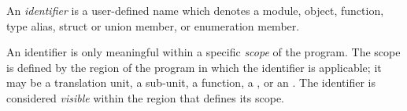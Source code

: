
\begin{grammar}
\\
\\
 \terminal{::} \\

\exactly\\
\\
 \\

\oneof \\
     
     
 \\
    
     
  \\
     
     
 \\
    
     
  \\
\terminal{\_}\\

\oneof \\
     
   \\

\\
 \\
 \\
\end{grammar}


\specsubitem
An \textit{identifier} is a user-defined name which denotes a module, object,
function, type alias, struct or union member, or enumeration member.

\specsubitem
An identifier is only meaningful within a specific \textit{scope} of the
program. The scope is defined by the region of the program in which the
identifier is applicable; it may be a translation unit, a sub-unit, a function,
a , or an . The identifier is
considered \textit{visible} within the region that defines its scope.


